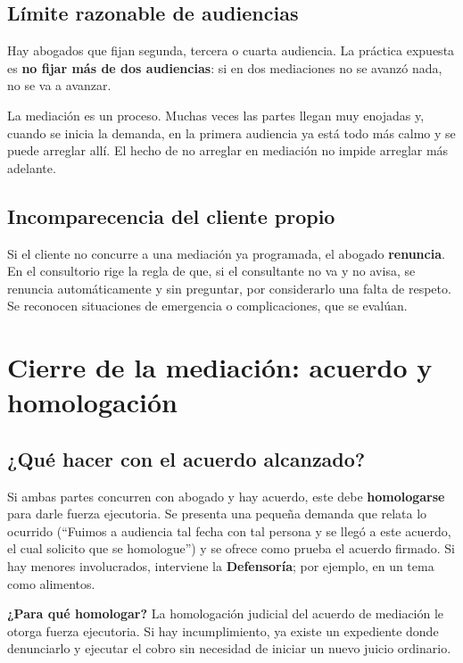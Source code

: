 \documentclass[12pt,oneside]{book}
\begin{document}
\subsection{Límite razonable de audiencias}

Hay abogados que fijan segunda, tercera o cuarta audiencia. La práctica expuesta es \textbf{no fijar más de dos audiencias}: si en dos mediaciones no se avanzó nada, no se va a avanzar.

La mediación es un proceso. Muchas veces las partes llegan muy enojadas y, cuando se inicia la demanda, en la primera audiencia ya está todo más calmo y se puede arreglar allí. El hecho de no arreglar en mediación no impide arreglar más adelante.

\subsection{Incomparecencia del cliente propio}

Si el cliente no concurre a una mediación ya programada, el abogado \textbf{renuncia}. En el consultorio rige la regla de que, si el consultante no va y no avisa, se renuncia automáticamente y sin preguntar, por considerarlo una falta de respeto. Se reconocen situaciones de emergencia o complicaciones, que se evalúan.

\section{Cierre de la mediación: acuerdo y homologación}

\subsection{¿Qué hacer con el acuerdo alcanzado?}

Si ambas partes concurren con abogado y hay acuerdo, este debe \textbf{homologarse} para darle fuerza ejecutoria. Se presenta una pequeña demanda que relata lo ocurrido (``Fuimos a audiencia tal fecha con tal persona y se llegó a este acuerdo, el cual solicito que se homologue'') y se ofrece como prueba el acuerdo firmado. Si hay menores involucrados, interviene la \textbf{Defensoría}; por ejemplo, en un tema como alimentos.

\begin{important}
\textbf{¿Para qué homologar?} La homologación judicial del acuerdo de mediación le otorga fuerza ejecutoria. Si hay incumplimiento, ya existe un expediente donde denunciarlo y ejecutar el cobro sin necesidad de iniciar un nuevo juicio ordinario.
\end{important}
\end{document}
